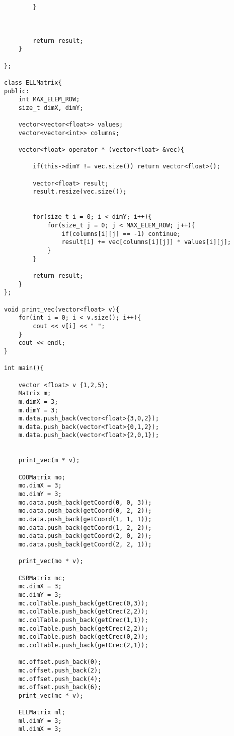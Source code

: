 \begin{verbatim}
        }



        return result;
    } 

};

class ELLMatrix{
public:
    int MAX_ELEM_ROW;
    size_t dimX, dimY;

    vector<vector<float>> values;
    vector<vector<int>> columns;

    vector<float> operator * (vector<float> &vec){
        
        if(this->dimY != vec.size()) return vector<float>();

        vector<float> result;
        result.resize(vec.size());


        for(size_t i = 0; i < dimY; i++){
            for(size_t j = 0; j < MAX_ELEM_ROW; j++){
                if(columns[i][j] == -1) continue;
                result[i] += vec[columns[i][j]] * values[i][j]; 
            }
        }

        return result;
    } 
};

void print_vec(vector<float> v){
    for(int i = 0; i < v.size(); i++){
        cout << v[i] << " ";
    }
    cout << endl;
}

int main(){

    vector <float> v {1,2,5};
    Matrix m;
    m.dimX = 3;
    m.dimY = 3;
    m.data.push_back(vector<float>{3,0,2});
    m.data.push_back(vector<float>{0,1,2});
    m.data.push_back(vector<float>{2,0,1});


    print_vec(m * v);

    COOMatrix mo;
    mo.dimX = 3;
    mo.dimY = 3;
    mo.data.push_back(getCoord(0, 0, 3));
    mo.data.push_back(getCoord(0, 2, 2));
    mo.data.push_back(getCoord(1, 1, 1));
    mo.data.push_back(getCoord(1, 2, 2));
    mo.data.push_back(getCoord(2, 0, 2));
    mo.data.push_back(getCoord(2, 2, 1));

    print_vec(mo * v);

    CSRMatrix mc;
    mc.dimX = 3;
    mc.dimY = 3;
    mc.colTable.push_back(getCrec(0,3));
    mc.colTable.push_back(getCrec(2,2));
    mc.colTable.push_back(getCrec(1,1));
    mc.colTable.push_back(getCrec(2,2));
    mc.colTable.push_back(getCrec(0,2));
    mc.colTable.push_back(getCrec(2,1));

    mc.offset.push_back(0);
    mc.offset.push_back(2);
    mc.offset.push_back(4);
    mc.offset.push_back(6);
    print_vec(mc * v);

    ELLMatrix ml;
    ml.dimY = 3;
    ml.dimX = 3;


\end{verbatim}

